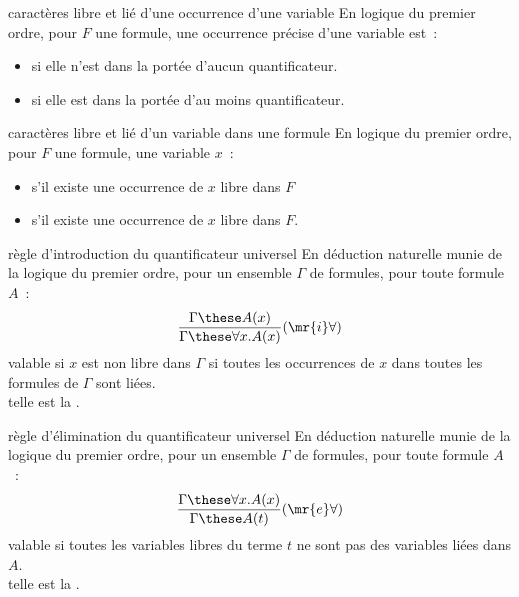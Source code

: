 \begin{adjustwidth}{-3cm}{-3cm}
\begin{definition}{7.24}{caractères libre et lié d'une occurrence d'une variable}
    En logique du premier ordre, pour $F$ une formule, une occurrence précise d'une variable est~:
    \begin{itemize}
        \item {} si elle n'est dans la portée d'aucun quantificateur.
        \item {} si elle est dans la portée d'au moins quantificateur.
    \end{itemize}
\end{definition}

\begin{definition}{7.25}{caractères libre et lié d'un variable dans une formule}
    En logique du premier ordre, pour $F$ une formule, une variable $x$~:
    \begin{itemize}
        \item {} s'il existe une occurrence de $x$ libre dans $F$
        \item {} s'il existe une occurrence de $x$ libre dans $F$.
    \end{itemize}
\end{definition}


\begin{definition}{7.26}{règle d'introduction du quantificateur universel}
    En déduction naturelle munie de la logique du premier ordre, pour un ensemble $\Gamma$ de formules, pour toute formule $A$~:
    $$\frac{\Gamma \these A(x)}{\Gamma \these \forall x.A(x)}(\mr{i}\forall)$$
    valable si $x$ est non libre dans $\Gamma$ \ie si toutes les occurrences de $x$ dans toutes les formules de $\Gamma$ sont liées.\\
    telle est la .
\end{definition}

\begin{definition}{7.27}{règle d'élimination du quantificateur universel}
    En déduction naturelle munie de la logique du premier ordre, pour un ensemble $\Gamma$ de formules, pour toute formule $A$~:
    $$\frac{\Gamma \these \forall x.A(x)}{\Gamma \these A(t)}(\mr{e}\forall)$$
    valable si toutes les variables libres du terme $t$ ne sont pas des variables liées dans $A$.\\
    telle est la .
\end{definition}


\end{adjustwidth}
